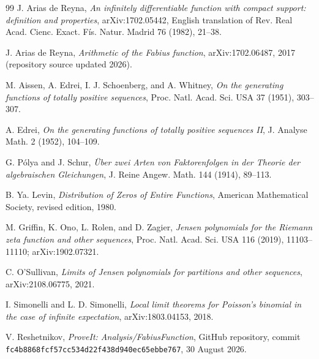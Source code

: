 \documentclass[11pt]{article}
\numberwithin{equation}{section}
\theoremstyle{definition}
\theoremstyle{remark}
\begin{document}
\begingroup
\sloppy
\begin{thebibliography}{99}
J. Arias de Reyna,
\emph{An infinitely differentiable function with compact support: definition and properties},
arXiv:1702.05442, English translation of Rev. Real Acad. Cienc. Exact. Fís. Natur. Madrid 76 (1982), 21--38.

J. Arias de Reyna,
\emph{Arithmetic of the Fabius function},
arXiv:1702.06487, 2017 (repository source updated 2026).

M. Aissen, A. Edrei, I. J. Schoenberg, and A. Whitney,
\emph{On the generating functions of totally positive sequences},
Proc. Natl. Acad. Sci. USA 37 (1951), 303--307.

A. Edrei,
\emph{On the generating functions of totally positive sequences II},
J. Analyse Math. 2 (1952), 104--109.

G. Pólya and J. Schur,
\emph{Über zwei Arten von Faktorenfolgen in der Theorie der algebraischen Gleichungen},
J. Reine Angew. Math. 144 (1914), 89--113.

B. Ya. Levin,
\emph{Distribution of Zeros of Entire Functions},
American Mathematical Society, revised edition, 1980.

M. Griffin, K. Ono, L. Rolen, and D. Zagier,
\emph{Jensen polynomials for the Riemann zeta function and other sequences},
Proc. Natl. Acad. Sci. USA 116 (2019), 11103--11110; arXiv:1902.07321.

C. O'Sullivan,
\emph{Limits of Jensen polynomials for partitions and other sequences},
arXiv:2108.06775, 2021.

I. Simonelli and L. D. Simonelli,
\emph{Local limit theorems for Poisson's binomial in the case of infinite expectation},
arXiv:1803.04153, 2018.

V. Reshetnikov,
\emph{ProveIt: Analysis/FabiusFunction}, GitHub repository,
commit \nolinkurl{fc4b8868fcf57cc534d22f438d940ec65ebbe767}, 30 August 2026.
\end{thebibliography}
\endgroup
\end{document}
